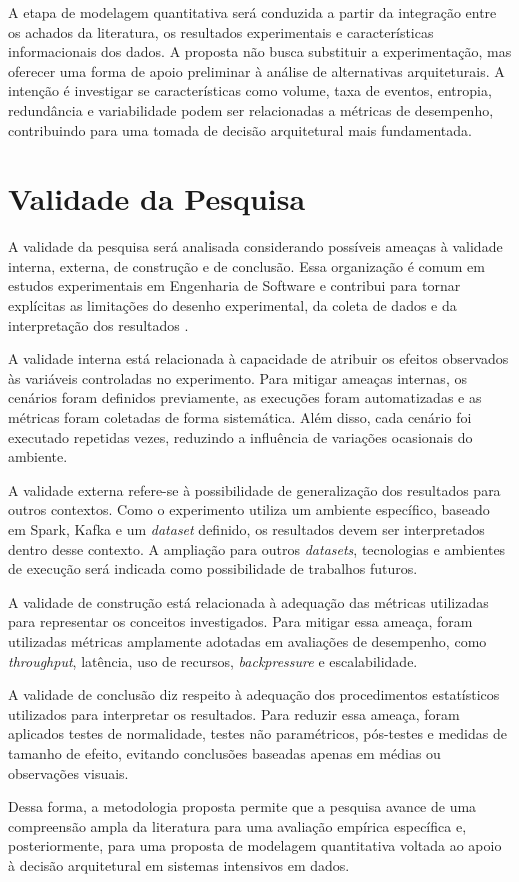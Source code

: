 A etapa de modelagem quantitativa será conduzida a partir da integração entre os achados da literatura, os resultados experimentais e características informacionais dos dados. A proposta não busca substituir a experimentação, mas oferecer uma forma de apoio preliminar à análise de alternativas arquiteturais. A intenção é investigar se características como volume, taxa de eventos, entropia, redundância e variabilidade podem ser relacionadas a métricas de desempenho, contribuindo para uma tomada de decisão arquitetural mais fundamentada.

\section{Validade da Pesquisa}
\label{sec:validade-pesquisa}

A validade da pesquisa será analisada considerando possíveis ameaças à validade interna, externa, de construção e de conclusão. Essa organização é comum em estudos experimentais em Engenharia de Software e contribui para tornar explícitas as limitações do desenho experimental, da coleta de dados e da interpretação dos resultados \cite{wohlin2012experimentation}.

A validade interna está relacionada à capacidade de atribuir os efeitos observados às variáveis controladas no experimento. Para mitigar ameaças internas, os cenários foram definidos previamente, as execuções foram automatizadas e as métricas foram coletadas de forma sistemática. Além disso, cada cenário foi executado repetidas vezes, reduzindo a influência de variações ocasionais do ambiente.

A validade externa refere-se à possibilidade de generalização dos resultados para outros contextos. Como o experimento utiliza um ambiente específico, baseado em Spark, Kafka e um \textit{dataset} definido, os resultados devem ser interpretados dentro desse contexto. A ampliação para outros \textit{datasets}, tecnologias e ambientes de execução será indicada como possibilidade de trabalhos futuros.

A validade de construção está relacionada à adequação das métricas utilizadas para representar os conceitos investigados. Para mitigar essa ameaça, foram utilizadas métricas amplamente adotadas em avaliações de desempenho, como \textit{throughput}, latência, uso de recursos, \textit{backpressure} e escalabilidade.

A validade de conclusão diz respeito à adequação dos procedimentos estatísticos utilizados para interpretar os resultados. Para reduzir essa ameaça, foram aplicados testes de normalidade, testes não paramétricos, pós-testes e medidas de tamanho de efeito, evitando conclusões baseadas apenas em médias ou observações visuais.

Dessa forma, a metodologia proposta permite que a pesquisa avance de uma compreensão ampla da literatura para uma avaliação empírica específica e, posteriormente, para uma proposta de modelagem quantitativa voltada ao apoio à decisão arquitetural em sistemas intensivos em dados.

